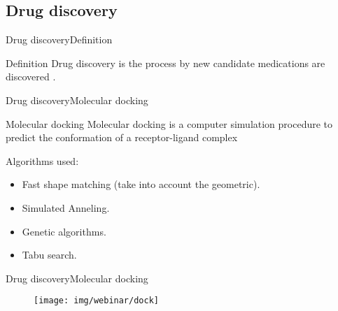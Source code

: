 \documentclass[10pt]{beamer}
\newcommand{\1}{
        	\setbeamertemplate{background}{
        		\texttt{[image: img/1]}
        		\tikz[overlay] \fill[fill opacity=0.75,fill=white] (0,0) rectangle (-\paperwidth,\paperheight);
        	}
}
\begin{document}
\subsection{Drug discovery}

\begin{frame}{Drug discovery}{Definition}
	\begin{block}{Definition}
		Drug discovery is the process by new candidate medications are discovered \cite{usafooddrug2020}.
	\end{block}
\end{frame}

\begin{frame}{Drug discovery}{Molecular docking}
	\begin{block}{Molecular docking}
		Molecular docking is a computer simulation procedure to
		predict the conformation of a receptor-ligand complex \cite{dias2008molecular}
	\end{block}
	
	\begin{block}{}
		Algorithms used:
		\begin{itemize}
			\item Fast shape matching (take into account the geometric).
			\item Simulated Anneling.
			\item Genetic algorithms.
			\item Tabu search.
		\end{itemize}
	\end{block}
\end{frame}

\begin{frame}{Drug discovery}{Molecular docking}
	\begin{figure}[]
		\centering
		\texttt{[image: img/webinar/dock]}
		\label{img:mot2}
	\end{figure}
\end{frame}
\end{document}
